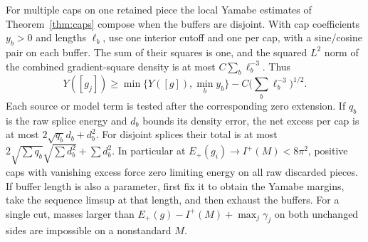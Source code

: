 \documentclass[11pt]{article}
\numberwithin{equation}{section}
\theoremstyle{definition}
\theoremstyle{remark}
\begin{document}
For multiple caps on one retained piece the local Yamabe
estimates of Theorem~\ref{thm:caps} compose when the buffers
are disjoint. With cap coefficients \(y_b>0\) and lengths
\(\ell_b\), use one interior cutoff and one per cap, with a
sine/cosine pair on each buffer. The sum of their squares is
one, and the squared \(L^2\) norm of the combined gradient-square
density is at most \(C\sum_b\ell_b^{-3}\). Thus
\[
 Y([g_j])\ge \min\{Y([g]),\min_b y_b\}
                -C\Big(\sum_b\ell_b^{-3}\Big)^{1/2}.
\]
Each source or model term is tested after the corresponding zero
extension. If \(q_b\) is the raw splice energy and \(d_b\)
bounds its density error, the net excess per cap is at most
\(2\sqrt{q_b}d_b+d_b^2\). For disjoint splices their total is
at most \(2\sqrt{\sum q_b}\sqrt{\sum d_b^2}+\sum d_b^2\).
In particular at \(E_+(g_i)\to I^+(M)<8\pi^2\), positive caps
with vanishing excess force zero limiting energy on all raw
discarded pieces. If buffer length is also a parameter, first fix
it to obtain the Yamabe margins, take the sequence limsup at
that length, and then exhaust the buffers. For a single cut,
masses larger than \(E_+(g)-I^+(M)+\max_j\gamma_j\) on both
unchanged sides are impossible on a nonstandard \(M\).
\end{document}

